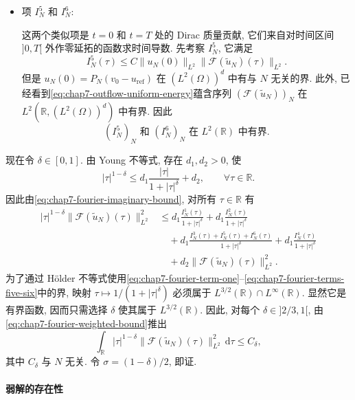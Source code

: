 \begin{sloppypar}
\begin{Proof}
\begin{itemize}
\item 项 $I_N^5$ 和 $I_N^6$:

这两个类似项是 $t=0$ 和 $t=T$ 处的 Dirac 质量贡献, 它们来自对时间区间 $]0,T[$ 外作零延拓的函数求时间导数. 先考察 $I_N^5$, 它满足
\[
 I_N^5(\tau)\leq C\|u_N(0)\|_{L^2}
 \|\mathcal F(\widetilde u_N)(\tau)\|_{L^2}.
\]
但是 $u_N(0)=P_N(v_0-u_{\mathrm{ref}})$ 在 $(L^2(\Omega))^d$ 中有与 $N$ 无关的界. 此外, 已经看到\eqref{eq:chap7-outflow-uniform-energy}蕴含序列 $(\mathcal F(\widetilde u_N))_N$ 在 $L^2(\mathbb R,(L^2(\Omega))^d)$ 中有界. 因此
\begin{equation}
 (I_N^5)_N\text{ 和 }(I_N^6)_N\text{ 在 }L^2(\mathbb R)\text{ 中有界}.
\label{eq:chap7-fourier-terms-five-six}
\end{equation}
\end{itemize}

现在令 $\delta\in[0,1]$. 由 Young 不等式, 存在 $d_1,d_2>0$, 使
\[
 |\tau|^{1-\delta}\leq d_1\frac{|\tau|}{1+|\tau|^\delta}+d_2,
 \qquad\forall\tau\in\mathbb R.
\]
因此由\eqref{eq:chap7-fourier-imaginary-bound}, 对所有 $\tau\in\mathbb R$ 有
\begin{equation}
\begin{aligned}
 |\tau|^{1-\delta}\|\mathcal F(\widetilde u_N)(\tau)\|_{L^2}^2
 &\leq d_1\frac{I_N^1(\tau)}{1+|\tau|^\delta}
 +d_1\frac{I_N^2(\tau)}{1+|\tau|^\delta}\\
 &\quad+d_1\frac{I_N^3(\tau)+I_N^5(\tau)+I_N^6(\tau)}{1+|\tau|^\delta}
 +d_1\frac{I_N^4(\tau)}{1+|\tau|^\delta}\\
 &\quad+d_2\|\mathcal F(\widetilde u_N)(\tau)\|_{L^2}^2.
\end{aligned}
\label{eq:chap7-fourier-weighted-bound}
\end{equation}
为了通过 H\"older 不等式使用\eqref{eq:chap7-fourier-term-one}--\eqref{eq:chap7-fourier-terms-five-six}中的界, 映射
$\tau\mapsto1/(1+|\tau|^\delta)$ 必须属于 $L^{3/2}(\mathbb R)\cap L^\infty(\mathbb R)$. 显然它是有界函数, 因而只需选择 $\delta$ 使其属于 $L^{3/2}(\mathbb R)$. 因此, 对每个 $\delta\in]2/3,1[$, 由\eqref{eq:chap7-fourier-weighted-bound}推出
\[
 \int_\mathbb R|\tau|^{1-\delta}
 \|\mathcal F(\widetilde u_N)(\tau)\|_{L^2}^2\,\mathrm d\tau
 \leq C_\delta,
\]
其中 $C_\delta$ 与 $N$ 无关. 令 $\sigma=(1-\delta)/2$, 即证.
\end{Proof}

\paragraph{弱解的存在性}
\label{subsec:chap7-outflow-weak-solution}


\end{sloppypar}
